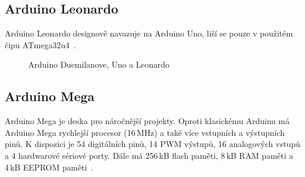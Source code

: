 		\subsection{Arduino Leonardo} 
		Arduino Leonardo designově navazuje na Arduino Uno, liší se pouze v použitém čipu ATmega32u4~\cite{ArduinoLeonardo}.


\begin{figure}[!ht]
    \centering
			\hspace*{5mm}
			\hspace*{5mm}
    \caption{Arduino Duemilanove, Uno a Leonardo}
		\vspace{-10pt}	
\end{figure}


\newpage
	
					\subsection{Arduino Mega} 
					Arduino Mega je deska pro náročnější projekty. Oproti klasickému Arduinu má Arduino Mega rychlejší procesor (16\,MHz) a také více vstupních a výstupních pinů. K dispozici je 54 digitálních pinů, 14 PWM výstupů, 16 analogových vstupů a 4 hardwarové sériové porty. Dále má 256\,kB flash paměti, 8\,kB RAM paměti a 4\,kB EEPROM paměti~\cite{ArduinoMega}.	
			

